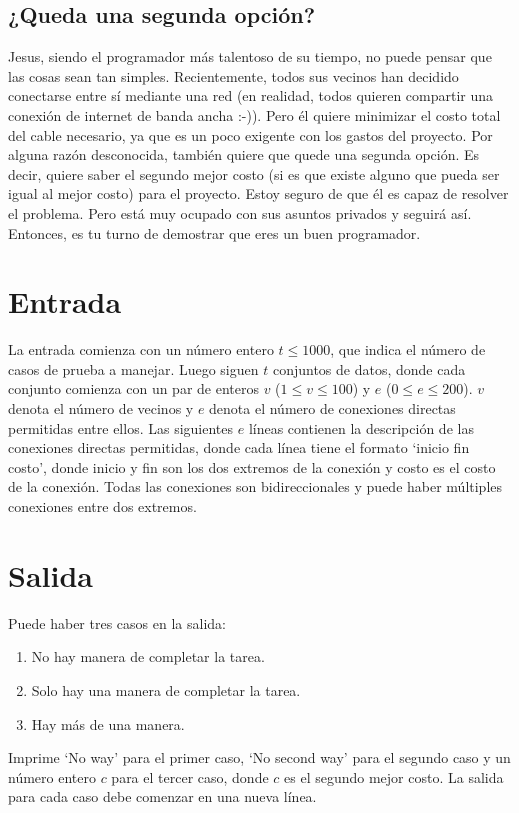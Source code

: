 \newpage
\subsection*{ ¿Queda una segunda opción?}


Jesus, siendo el programador más talentoso de su tiempo, no puede pensar que las cosas sean
tan simples. Recientemente, todos sus vecinos han decidido conectarse entre sí mediante
una red (en realidad, todos quieren compartir una conexión de internet de banda ancha
:-)). Pero él quiere minimizar el costo total del cable necesario, ya que es un poco
exigente con los gastos del proyecto. Por alguna razón desconocida, también quiere que
quede una segunda opción. Es decir, quiere saber el segundo mejor costo (si es que existe
alguno que pueda ser igual al mejor costo) para el proyecto. Estoy seguro de que él es
capaz de resolver el problema. Pero está muy ocupado con sus asuntos privados y seguirá
así. Entonces, es tu turno de demostrar que eres un buen programador. 

\section*{Entrada}

La entrada comienza con un número entero \(t \leq 1000\), que indica el número de casos de
prueba a manejar. Luego siguen \(t\) conjuntos de datos, donde cada conjunto comienza con
un par de enteros \(v\) (\(1 \leq v \leq 100\)) y \(e\) (\(0 \leq e \leq 200\)). \(v\)
denota el número de vecinos y \(e\) denota el número de conexiones directas permitidas
entre ellos. Las siguientes \(e\) líneas contienen la descripción de las conexiones
directas permitidas, donde cada línea tiene el formato ‘inicio fin costo’, donde inicio y
fin son los dos extremos de la conexión y costo es el costo de la conexión. Todas las
conexiones son bidireccionales y puede haber múltiples conexiones entre dos extremos.

\section*{Salida}

Puede haber tres casos en la salida:

\begin{enumerate}
    \item No hay manera de completar la tarea.
    \item Solo hay una manera de completar la tarea.
    \item Hay más de una manera.
\end{enumerate}

Imprime ‘No way’ para el primer caso, ‘No second way’ para el segundo caso y un número
entero \(c\) para el tercer caso, donde \(c\) es el segundo mejor costo. La salida para
cada caso debe comenzar en una nueva línea.





